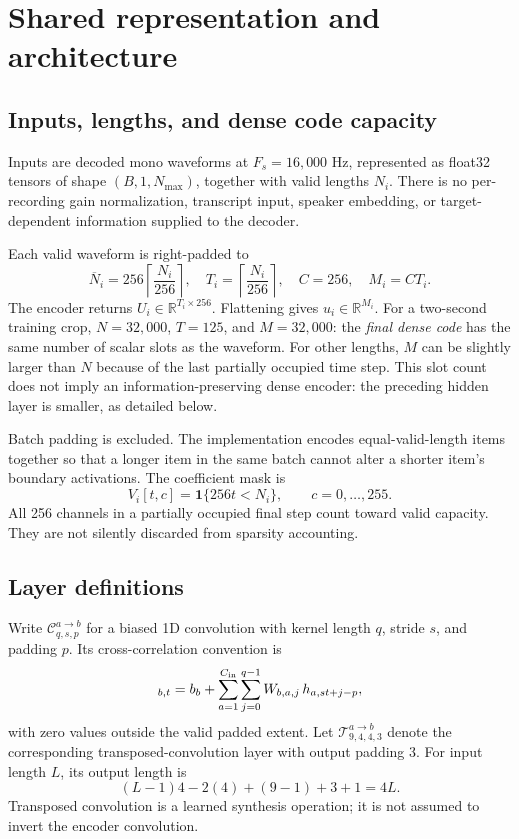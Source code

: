 \documentclass[11pt,a4paper]{article}
\newcommand{\R}{\mathbb{R}}
\begin{document}
\section{Shared representation and architecture}
\subsection{Inputs, lengths, and dense code capacity}
Inputs are decoded mono waveforms at $F_s=16{,}000$ Hz, represented as float32 tensors of shape $(B,1,N_{\max})$, together with valid lengths $N_i$. There is no per-recording gain normalization, transcript input, speaker embedding, or target-dependent information supplied to the decoder.

Each valid waveform is right-padded to
\begin{equation}
 \overline N_i=256\left\lceil\frac{N_i}{256}\right\rceil,\quad
 T_i=\left\lceil\frac{N_i}{256}\right\rceil,\quad
 C=256,\quad M_i=C T_i.
 \label{eq:capacity}
\end{equation}
The encoder returns $U_i\in\R^{T_i\times256}$. Flattening gives $u_i\in\R^{M_i}$. For a two-second training crop, $N=32{,}000$, $T=125$, and $M=32{,}000$: the \emph{final dense code} has the same number of scalar slots as the waveform. For other lengths, $M$ can be slightly larger than $N$ because of the last partially occupied time step. This slot count does not imply an information-preserving dense encoder: the preceding hidden layer is smaller, as detailed below.

Batch padding is excluded. The implementation encodes equal-valid-length items together so that a longer item in the same batch cannot alter a shorter item's boundary activations. The coefficient mask is
\begin{equation}
 V_i[t,c]=\mathbf 1\{256t<N_i\},\qquad c=0,\ldots,255.
\end{equation}
All 256 channels in a partially occupied final step count toward valid capacity. They are not silently discarded from sparsity accounting.

\subsection{Layer definitions}
Write $\mathcal C^{a\to b}_{q,s,p}$ for a biased 1D convolution with kernel length $q$, stride $s$, and padding $p$. Its cross-correlation convention is
\begin{equation}
 [\mathcal C(h)]_{b,t}=b_b+\sum_{a=1}^{C_{\rm in}}\sum_{j=0}^{q-1}
 W_{b,a,j}\,h_{a,st+j-p},
\end{equation}
with zero values outside the valid padded extent. Let $\mathcal T^{a\to b}_{9,4,4,3}$ denote the corresponding transposed-convolution layer with output padding 3. For input length $L$, its output length is
\begin{equation}
 (L-1)4-2(4)+(9-1)+3+1=4L.
\end{equation}
Transposed convolution is a learned synthesis operation; it is not assumed to invert the encoder convolution.
\end{document}
